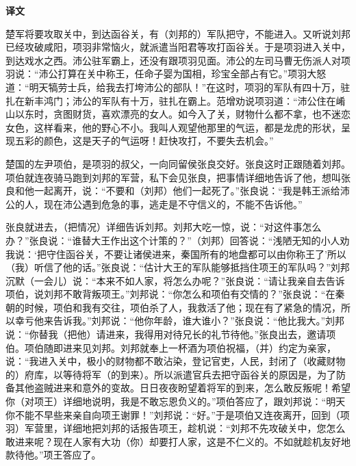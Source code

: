 \documentclass[12pt,UTF-8,openany,a4]{ctexbook}
\begin{document}
\newpage

\begin{Large}
    \noindent\textbf{译文}
\end{Large}


\vspace{1em}

\begin{large}
    \yiwen 
    楚军将要攻取关中，到达函谷关，有（刘邦的）军队把守，不能进入。又听说刘邦已经攻破咸阳，项羽非常恼火，就派遣当阳君等攻打函谷关。于是项羽进入关中，到达戏水之西。沛公驻军霸上，还没有跟项羽见面。沛公的左司马曹无伤派人对项羽说：“沛公打算在关中称王，任命子婴为国相，珍宝全部占有它。”项羽大怒道：“明天犒劳士兵，给我去打垮沛公的部队！”在这时，项羽的军队有四十万，驻扎在新丰鸿门；沛公的军队有十万，驻扎在霸上。范增劝说项羽道：“沛公住在崤山以东时，贪图财货，喜欢漂亮的女人。如今入了关，财物什么都不拿，也不迷恋女色，这样看来，他的野心不小。我叫人观望他那里的气运，都是龙虎的形状，呈现五彩的颜色，这是天子的气运呀！赶快攻打，不要失去机会。”
    
    楚国的左尹项伯，是项羽的叔父，一向同留侯张良交好。张良这时正跟随着刘邦。项伯就连夜骑马跑到刘邦的军营，私下会见张良，把事情详细地告诉了他，想叫张良和他一起离开，说：“不要和（刘邦）他们一起死了。”张良说：“我是韩王派给沛公的人，现在沛公遇到危急的事，逃走是不守信义的，不能不告诉他。”
    
    张良就进去，（把情况）详细告诉刘邦。刘邦大吃一惊，说：“对这件事怎么办？”张良说：“谁替大王作出这个计策的？”（刘邦）回答说：“浅陋无知的小人劝我说：‘把守住函谷关，不要让诸侯进来，秦国所有的地盘都可以由你称王了’所以（我）听信了他的话。”张良说：“估计大王的军队能够抵挡住项王的军队吗？”刘邦沉默（一会儿）说：“本来不如人家，将怎么办呢？”张良说：“请让我亲自去告诉项伯，说刘邦不敢背叛项王。”刘邦说：“你怎么和项伯有交情的？”张良说：“在秦朝的时候，项伯和我有交往，项伯杀了人，我救活了他；现在有了紧急的情况，所以幸亏他来告诉我。”刘邦说：“他你年龄，谁大谁小？”张良说：“他比我大。”刘邦说：“你替我（把他）请进来，我得用对待兄长的礼节待他。”张良出去，邀请项伯。项伯随即进来见刘邦。刘邦就奉上一杯酒为项伯祝福，（并）约定为亲家，说：“我进入关中，极小的财物都不敢沾染，登记官吏，人民，封闭了（收藏财物的）府库，以等待将军（的到来）。所以派遣官兵去把守函谷关的原因是，为了防备其他盗贼进来和意外的变故。日日夜夜盼望着将军的到来，怎么敢反叛呢！希望你（对项王）详细地说明，我是不敢忘恩负义的。”项伯答应了，跟刘邦说：“明天你不能不早些来亲自向项王谢罪！”刘邦说：“好。”于是项伯又连夜离开，回到（项羽）军营里，详细地把刘邦的话报告项王，趁机说：“刘邦不先攻破关中，您怎么敢进来呢？现在人家有大功（你）却要打人家，这是不仁义的。不如就趁机友好地款待他。”项王答应了。
    

\end{large}
\end{document}
